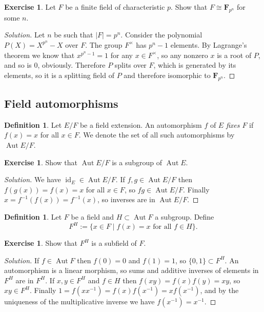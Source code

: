 \documentclass[11pt]{amsart}
\theoremstyle{definition}
\newtheorem{defi}[theo]{Definition}
\newtheorem{e}[theo]{Exercise}
\newenvironment{s}{\begin{proof}[Solution]}{\end{proof}}
\def\FF{\mathbf{F}}
\DeclareMathOperator{\id}{id}
\DeclareMathOperator{\Aut}{Aut}
\begin{document}
\begin{e}
Let $F$ be a finite field of characteristic $p$.
Show that $F \cong \FF_{p^n}$ for some $n$.
\end{e}

\begin{s}
Let $n$ be such that $|F| = p^n$.
Consider the polynomial $P(X) = X^{p^n} - X$ over $F$.
The group $F^{\times}$ has $p^n-1$ elements.
By Lagrange's theorem we know that $x^{p^n-1} = 1$ for any $x \in F^\times$, so any nonzero $x$ is a root of $P$, and so is $0$, obviously.
Therefore $P$ splits over $F$, which is generated by its elements, so it is a splitting field of $P$ and therefore isomorphic to $\FF_{p^n}$.
\end{s}



\subsection*{Field automorphisms}

\begin{defi}
Let $E/F$ be a field extension.
An automorphism $f$ of $E$ \emph{fixes $F$} if $f(x) = x$ for all $x \in F$.
We denote the set of all such automorphisms by $\Aut E/F$.
\end{defi}

\begin{e}
Show that $\Aut E/F$ is a subgroup of $\Aut E$.
\end{e}

\begin{s}
We have $\id_E \in \Aut E/F$.
If $f,g \in \Aut E/F$ then $f(g(x)) = f(x) = x$ for all $x \in F$, so $fg \in \Aut E/F$.
Finally $x = f^{-1}(f(x)) = f^{-1}(x)$, so inverses are in $\Aut E/F$.
\end{s}


\begin{defi}
Let $F$ be a field and $H \subset \Aut F$ a subgroup.
Define
\[
F^H := \{ x \in F \mid \text{$f(x) = x$ for all $f \in H$}\}.
\]
\end{defi}

\begin{e}
Show that $F^H$ is a subfield of $F$.
\end{e}

\begin{s}
If $f \in \Aut F$ then $f(0) = 0$ and $f(1) = 1$, so $\{0,1\} \subset F^H$.
An automorphism is a linear morphism, so sums and additive inverses of elements in $F^H$ are in $F^H$.
If $x,y \in F^H$ and $f \in H$ then $f(xy) = f(x)f(y) = xy$, so $xy \in F^H$.
Finally $1 = f(x x^{-1}) = f(x) f(x^{-1}) = x f(x^{-1})$, and by the uniqueness of the multiplicative inverse we have $f(x^{-1}) = x^{-1}$.
\end{s}
\end{document}
